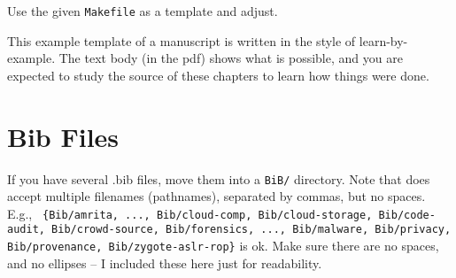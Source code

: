Use the given {\tt Makefile} as a template and adjust.

This example template of a manuscript is written in the style of
learn-by-example.  The text body (in the pdf) shows what is possible,
and you are expected to study the \latex{} source of these chapters to
learn how things were done.

\section{Bib Files}
\label{BibFiles}

If you have several .bib files, move them into a {\tt BiB/} directory.
Note that \verb|| does accept multiple filenames
(pathnames), separated by commas, but no spaces.  E.g., {\tt
  \verb||\{Bib/amrita, ..., Bib/cloud-comp,
  Bib/cloud-storage, Bib/code-audit, Bib/crowd-source, Bib/forensics,
  ..., Bib/malware, Bib/privacy, Bib/provenance,
  Bib/zygote-aslr-rop\}} is {\sc ok}.  Make sure there are no spaces,
and no ellipses -- I included these here just for readability.

